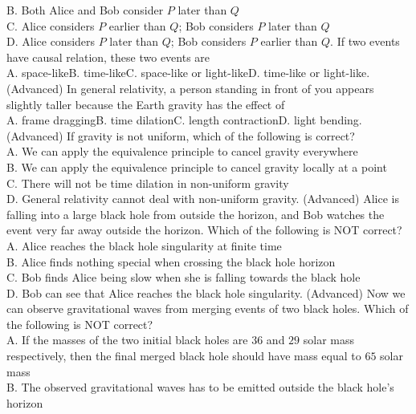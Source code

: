 \documentclass[12pt]{book} %
\numberwithin{equation}{chapter}
\def\mc{\hspace{0.5cm}}
\begin{document}
B. Both Alice and Bob consider $P$ later than $Q$\\
C. Alice considers $P$ earlier than $Q$; Bob considers $P$ later than $Q$\\
D. Alice considers $P$ later than $Q$; Bob considers $P$ earlier than $Q$\bigskip{}. If two events have causal relation, these two events are\\
A. space-like\mc B. time-like\mc C. space-like or light-like\mc D. time-like or light-like\bigskip{}. (Advanced) In general relativity, a person standing in front of you appears slightly taller because the Earth gravity has the effect of\\
A. frame dragging\mc B. time dilation\mc C. length contraction\mc D. light bending\bigskip{}. (Advanced) If gravity is not uniform, which of the following is correct?\\
A. We can apply the equivalence principle to cancel gravity everywhere\\
B. We can apply the equivalence principle to cancel gravity locally at a point\\
C. There will not be time dilation in non-uniform gravity\\
D. General relativity cannot deal with non-uniform gravity\bigskip{}. (Advanced) Alice is falling into a large black hole from outside the horizon, and Bob watches the event very far away outside the horizon. Which of the following is NOT correct?\\
A. Alice reaches the black hole singularity at finite time\\
B. Alice finds nothing special when crossing the black hole horizon\\
C. Bob finds Alice being slow when she is falling towards the black hole\\
D. Bob can see that Alice reaches the black hole singularity\bigskip{}. (Advanced) Now we can observe gravitational waves from merging events of two black holes. Which of the following is NOT correct?\\
A. If the masses of the two initial black holes are $36$ and $29$ solar mass respectively, then the final merged black hole should have mass equal to $65$ solar mass\\
B. The observed gravitational waves has to be emitted outside the black hole's horizon\\
\end{document}
